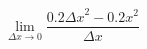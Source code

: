 \documentclass[preview]{standalone}
\begin{document}
\begin{center}
$$\lim_{\Delta x \to 0}\frac{0.2 {\Delta x}^2 - 0.2x^2}{\Delta x}$$
\end{center}
\end{document}

